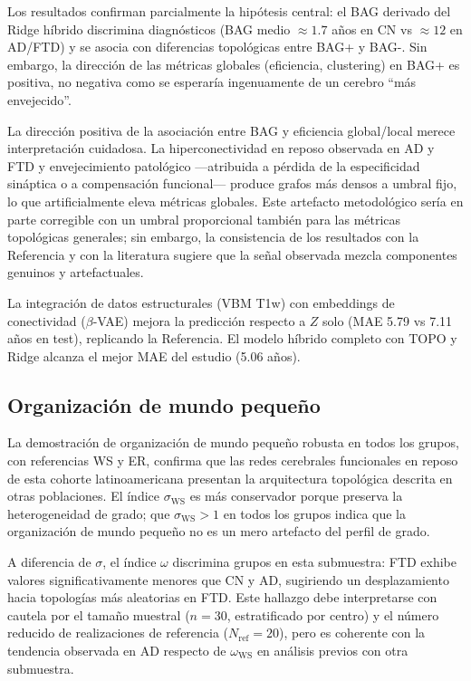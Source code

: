 \documentclass[12pt,a4paper]{article}
\begin{document}
Los resultados confirman parcialmente la hipótesis central: el BAG derivado del Ridge híbrido
discrimina diagnósticos (BAG medio $\approx 1.7$ años en CN vs $\approx 12$ en AD/FTD) y se
asocia con diferencias topológicas entre BAG+ y BAG-. Sin embargo, la dirección de las métricas
globales (eficiencia, clustering) en BAG+ es positiva, no negativa como se esperaría
ingenuamente de un cerebro ``más envejecido''.

La dirección positiva de la asociación entre BAG y eficiencia global/local merece interpretación
cuidadosa. La hiperconectividad en reposo observada en AD y FTD y envejecimiento patológico
---atribuida a pérdida de la especificidad sináptica o a compensación funcional--- produce
grafos más densos a umbral fijo, lo que artificialmente eleva métricas globales. Este artefacto
metodológico sería en parte corregible con un umbral proporcional también para las métricas
topológicas generales; sin
embargo, la consistencia de los resultados con la Referencia y con la literatura sugiere que
la señal observada mezcla componentes genuinos y artefactuales.

La integración de datos estructurales (VBM T1w) con embeddings de conectividad ($\beta$-VAE)
mejora la predicción respecto a $Z$ solo (MAE 5.79 vs 7.11 años en test), replicando la
Referencia. El modelo híbrido completo con TOPO y Ridge alcanza el mejor MAE del estudio
(5.06 años).

\subsection{Organización de mundo pequeño}

La demostración de organización de mundo pequeño robusta en todos los grupos, con referencias WS
y ER, confirma que las redes cerebrales funcionales en reposo de esta cohorte latinoamericana
presentan la arquitectura topológica descrita en otras poblaciones. El índice $\sigma_{\text{WS}}$
es más conservador porque preserva la heterogeneidad de grado; que $\sigma_{\text{WS}} > 1$ en
todos los grupos indica que la organización de mundo pequeño no es un mero artefacto del perfil
de grado.

A diferencia de $\sigma$, el índice $\omega$ discrimina grupos en esta submuestra: FTD exhibe
valores significativamente menores que CN y AD, sugiriendo un desplazamiento hacia topologías
más aleatorias en FTD. Este hallazgo debe interpretarse con cautela por el
tamaño muestral ($n = 30$, estratificado por centro) y el número reducido de realizaciones de
referencia ($N_{\text{ref}} = 20$), pero es coherente con la tendencia observada en AD respecto
de $\omega_{\text{WS}}$ en análisis previos con otra submuestra.
\end{document}

